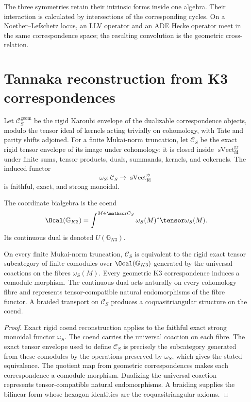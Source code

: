The three symmetries retain their intrinsic forms inside one algebra.  Their interaction is calculated by intersections of the corresponding cycles.  On a Noether--Lefschetz locus, an LLV operator and an ADE Hecke operator meet in the same correspondence space; the resulting convolution is the geometric cross-relation.

\chapter{Tannaka reconstruction from K3 correspondences}
Let $\mathscr C_S^{\mathrm{geom}}$ be the rigid Karoubi envelope of the dualizable correspondence objects, modulo the tensor ideal of kernels acting trivially on cohomology, with Tate and parity shifts adjoined.  For a finite Mukai-norm truncation, let $\mathscr C_S$ be the exact rigid tensor envelope of its image under cohomology: it is closed inside $\operatorname{sVect}^{\mathrm{gr}}_{\mathrm{fd}}$ under finite sums, tensor products, duals, summands, kernels, and cokernels.  The induced functor
\[
 \omega_S:\mathscr C_S\longrightarrow\operatorname{sVect}^{\mathrm{gr}}_{\mathrm{fd}}
\]
is faithful, exact, and strong monoidal.

\begin{definition}
The coordinate bialgebra is the coend
\[
 \Ocal(\mathbb G_{K3})
 =\int^{M\in\mathscr C_S}\omega_S(M)^*\tensor\omega_S(M).
\]
Its continuous dual is denoted $U(\mathbb G_{K3})$.
\end{definition}

\begin{theorem}
On every finite Mukai-norm truncation, $\mathscr C_S$ is equivalent to the rigid exact tensor subcategory of finite comodules over $\Ocal(\mathbb G_{K3})$ generated by the universal coactions on the fibres $\omega_S(M)$.  Every geometric K3 correspondence induces a comodule morphism.  The continuous dual acts naturally on every cohomology fibre and represents tensor-compatible natural endomorphisms of the fibre functor.  A braided transport on $\mathscr C_S$ produces a coquasitriangular structure on the coend.
\end{theorem}
\begin{proof}
Exact rigid coend reconstruction applies to the faithful exact strong monoidal functor $\omega_S$.  The coend carries the universal coaction on each fibre.  The exact tensor envelope used to define $\mathscr C_S$ is precisely the subcategory generated from these comodules by the operations preserved by $\omega_S$, which gives the stated equivalence.  The quotient map from geometric correspondences makes each correspondence a comodule morphism.  Dualizing the universal coaction represents tensor-compatible natural endomorphisms.  A braiding supplies the bilinear form whose hexagon identities are the coquasitriangular axioms.
\end{proof}

